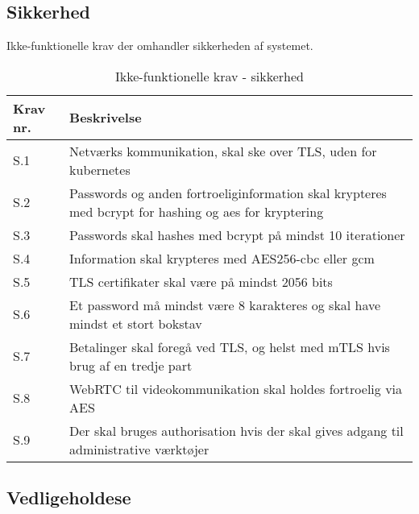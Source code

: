\subsection{Sikkerhed}

Ikke-funktionelle krav der omhandler sikkerheden af systemet.

\begin{table}[H]
    \centering
    \caption{Ikke-funktionelle krav - sikkerhed}
    \label{tab:if-security}
    \begin{tabular}{l|l}
        \textbf{Krav nr.} & \textbf{Beskrivelse}                                                                                                               \\\hline
        S.1               & \multicolumn{1}{p{8cm}}{Netværks kommunikation, skal ske over TLS, uden for kubernetes} \\\hline
        S.2               & \multicolumn{1}{p{8cm}}{Passwords og anden fortroeliginformation skal krypteres med bcrypt for hashing og aes for kryptering} \\\hline
        S.3               & \multicolumn{1}{p{8cm}}{Passwords skal hashes med bcrypt på mindst 10 iterationer} \\\hline
        S.4               & \multicolumn{1}{p{8cm}}{Information skal krypteres med AES256-cbc eller gcm} \\\hline
        S.5               & \multicolumn{1}{p{8cm}}{TLS certifikater skal være på mindst 2056 bits} \\\hline
        S.6               & \multicolumn{1}{p{8cm}}{Et password må mindst være 8 karakteres og skal have mindst et stort bokstav} \\\hline
        S.7               & \multicolumn{1}{p{8cm}}{Betalinger skal foregå ved TLS, og helst med mTLS hvis brug af en tredje part} \\\hline
        S.8               & \multicolumn{1}{p{8cm}}{WebRTC til videokommunikation skal holdes fortroelig via AES} \\\hline
        S.9               & \multicolumn{1}{p{8cm}}{Der skal bruges authorisation hvis der skal gives adgang til administrative værktøjer} \\\hline
    \end{tabular}
\end{table}

\subsection{Vedligeholdese}

